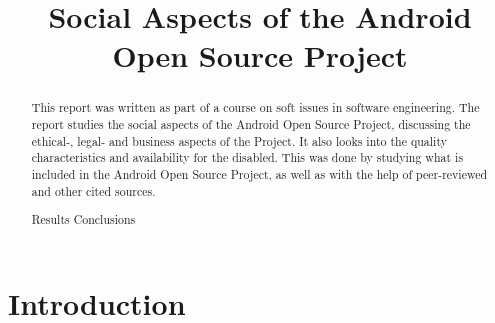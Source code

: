 \documentclass[conference]{IEEEtran}
\begin{document}
\title{Social Aspects of the Android Open Source Project}

\author{
{}
}


\maketitle


\begin{abstract}

This report was written as part of a course on soft issues in software engineering. The report studies the social aspects of the Android Open Source Project, discussing the ethical-, legal- and business aspects of the Project. It also looks into the quality characteristics and availability for the disabled. This was done by studying what is included in the Android Open Source Project, as well as with the help of peer-reviewed and other cited sources. 

Results
Conclusions

\end{abstract}


\section{Introduction}
\end{document}
